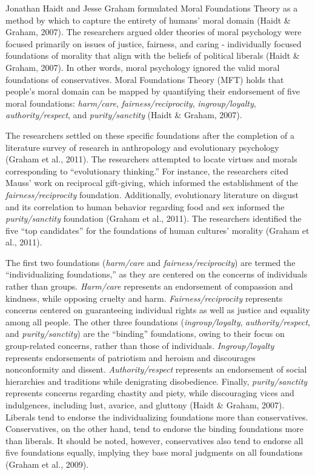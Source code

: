 \documentclass[,man]{apa6}
\begin{document}
Jonathan Haidt and Jesse Graham formulated Moral Foundations Theory as a method by which to capture the entirety of humans' moral domain (Haidt \& Graham, 2007). The researchers argued older theories of moral psychology were focused primarily on issues of justice, fairness, and caring - individually focused foundations of morality that align with the beliefs of political liberals (Haidt \& Graham, 2007). In other words, moral psychology ignored the valid moral foundations of conservatives. Moral Foundations Theory (MFT) holds that people's moral domain can be mapped by quantifying their endorsement of five moral foundations: \emph{harm/care}, \emph{fairness/reciprocity}, \emph{ingroup/loyalty}, \emph{authority/respect}, and \emph{purity/sanctity} (Haidt \& Graham, 2007).

The researchers settled on these specific foundations after the completion of a literature survey of research in anthropology and evolutionary psychology (Graham et al., 2011). The researchers attempted to locate virtues and morals corresponding to \enquote{evolutionary thinking.} For instance, the researchers cited Mauss' work on reciprocal gift-giving, which informed the establishment of the \emph{fairness/reciprocity} foundation. Additionally, evolutionary literature on disgust and its correlation to human behavior regarding food and sex informed the \emph{purity/sanctity} foundation (Graham et al., 2011). The researchers identified the five \enquote{top candidates} for the foundations of human cultures' morality (Graham et al., 2011).

The first two foundations (\emph{harm/care} and \emph{fairness/reciprocity}) are termed the \enquote{individualizing foundations,} as they are centered on the concerns of individuals rather than groups. \emph{Harm/care} represents an endorsement of compassion and kindness, while opposing cruelty and harm. \emph{Fairness/reciprocity} represents concerns centered on guaranteeing individual rights as well as justice and equality among all people. The other three foundations (\emph{ingroup/loyalty}, \emph{authority/respect}, and \emph{purity/sanctity}) are the \enquote{binding} foundations, owing to their focus on group-related concerns, rather than those of individuals. \emph{Ingroup/loyalty} represents endorsements of patriotism and heroism and discourages nonconformity and dissent. \emph{Authority/respect} represents an endorsement of social hierarchies and traditions while denigrating disobedience. Finally, \emph{purity/sanctity} represents concerns regarding chastity and piety, while discouraging vices and indulgences, including lust, avarice, and gluttony (Haidt \& Graham, 2007). Liberals tend to endorse the individualizing foundations more than conservatives. Conservatives, on the other hand, tend to endorse the binding foundations more than liberals. It should be noted, however, conservatives also tend to endorse all five foundations equally, implying they base moral judgments on all foundations (Graham et al., 2009).
\end{document}
